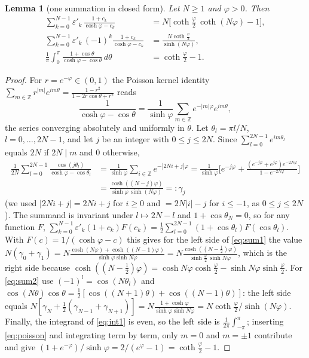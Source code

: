 \documentclass[11pt,a4paper]{article}
\newcommand{\Z}{\mathbb Z}
\theoremstyle{plain}
\newtheorem{lemma}[theorem]{Lemma}
\theoremstyle{definition}
\numberwithin{equation}{section}
\begin{document}
\begin{lemma}[one summation in closed form]\label{lem:cycle}
Let $N\ge1$ and $\varphi>0$. Then
\begin{align}
\sum_{k=0}^{N-1}\varepsilon'_k\,\frac{1+c_k}{\cosh\varphi-c_k}&=N\Big[\coth\frac\varphi2\,\coth(N\varphi)-1\Big],\label{eq:sum1}\\
\sum_{k=0}^{N-1}\varepsilon'_k\,(-1)^k\frac{1+c_k}{\cosh\varphi-c_k}&=\frac{N\coth\frac\varphi2}{\sinh(N\varphi)},\label{eq:sum2}\\
\frac1\pi\int_0^\pi\frac{1+\cos\theta}{\cosh\varphi-\cos\theta}\,d\theta&=\coth\frac\varphi2-1 .\label{eq:int1}
\end{align}
\end{lemma}
\begin{proof}
For $r=e^{-\varphi}\in(0,1)$ the Poisson kernel identity $\sum_{m\in\Z}r^{|m|}e^{im\theta}=\frac{1-r^2}{1-2r\cos\theta+r^2}$ reads
\begin{equation}\label{eq:poisson}
\frac{1}{\cosh\varphi-\cos\theta}=\frac{1}{\sinh\varphi}\sum_{m\in\Z}e^{-|m|\varphi}e^{im\theta},
\end{equation}
the series converging absolutely and uniformly in $\theta$. Let $\theta_l=\pi l/N$, $l=0,\dots,2N-1$, and let $j$ be an integer with $0\le j\le2N$. Since $\sum_{l=0}^{2N-1}e^{im\theta_l}$ equals $2N$ if $2N\mid m$ and $0$ otherwise,
\[
\begin{aligned}\frac{1}{2N}\sum_{l=0}^{2N-1}\frac{\cos(j\theta_l)}{\cosh\varphi-\cos\theta_l}&=\frac{1}{\sinh\varphi}\sum_{i\in\Z}e^{-|2Ni+j|\varphi}
=\frac{1}{\sinh\varphi}\Big[e^{-j\varphi}+\frac{(e^{-j\varphi}+e^{j\varphi})e^{-2N\varphi}}{1-e^{-2N\varphi}}\Big]\\&=\frac{\cosh((N-j)\varphi)}{\sinh\varphi\,\sinh(N\varphi)}=:\gamma_j\end{aligned}
\]
(we used $|2Ni+j|=2Ni+j$ for $i\ge0$ and $=2N|i|-j$ for $i\le-1$, as $0\le j\le2N$). The summand is invariant under $l\mapsto2N-l$ and $1+\cos\theta_N=0$, so for any function $F$,
$\sum_{k=0}^{N-1}\varepsilon'_k(1+c_k)F(c_k)=\frac12\sum_{l=0}^{2N-1}(1+\cos\theta_l)F(\cos\theta_l)$. With $F(c)=1/(\cosh\varphi-c)$ this gives for the left side of \eqref{eq:sum1} the value $N(\gamma_0+\gamma_1)=N\frac{\cosh(N\varphi)+\cosh((N-1)\varphi)}{\sinh\varphi\sinh N\varphi}=N\frac{\cosh((N-\frac12)\varphi)}{\sinh\frac\varphi2\,\sinh N\varphi}$, which is the right side because $\cosh((N-\frac12)\varphi)=\cosh N\varphi\cosh\frac\varphi2-\sinh N\varphi\sinh\frac\varphi2$. For \eqref{eq:sum2} use $(-1)^l=\cos(N\theta_l)$ and $\cos(N\theta)\cos\theta=\frac12[\cos((N+1)\theta)+\cos((N-1)\theta)]$: the left side equals $N[\gamma_N+\frac12(\gamma_{N-1}+\gamma_{N+1})]=N\frac{1+\cosh\varphi}{\sinh\varphi\sinh N\varphi}=N\coth\frac\varphi2/\sinh(N\varphi)$. Finally, the integrand of \eqref{eq:int1} is even, so the left side is $\frac1{2\pi}\int_{-\pi}^{\pi}$; inserting \eqref{eq:poisson} and integrating term by term, only $m=0$ and $m=\pm1$ contribute and give $(1+e^{-\varphi})/\sinh\varphi=2/(e^\varphi-1)=\coth\frac\varphi2-1$.
\end{proof}
\end{document}
